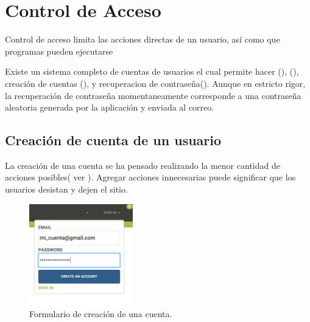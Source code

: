 \section{Control de Acceso}

Control de acceso limita las acciones directas de un usuario, así como que programas pueden ejecutarse \cite{sandhu1994access}
 
Existe un sistema completo de cuentas de usuarios el cual permite hacer \loginCPT(), \logoutCPT(), creación de cuentas (), y recuperacion de contraseña(). Aunque en estricto rigor, la recuperación de contraseña momentaneamente corresponde a una contraseña aleatoria generada por la aplicación y enviada al correo.


\subsection{Creación de cuenta de un usuario}\label{chapter:solucionimplementada:accounts:subsection:create}

La creación de una cuenta se ha pensado realizando la menor cantidad de acciones posibles( ver ). Agregar acciones innecesarias puede significar que los usuarios desistan y dejen el sitio\cite{online_goodgui_org}.

\begin{figure}[H]
	\centering
	\includegraphics[width=0.4\textwidth]{figuras/architecture/accounts/new/form.png}

	\caption{Formulario de creación de una cuenta.}
	\label{figure:architecture:accounts:new:form}
\end{figure}


